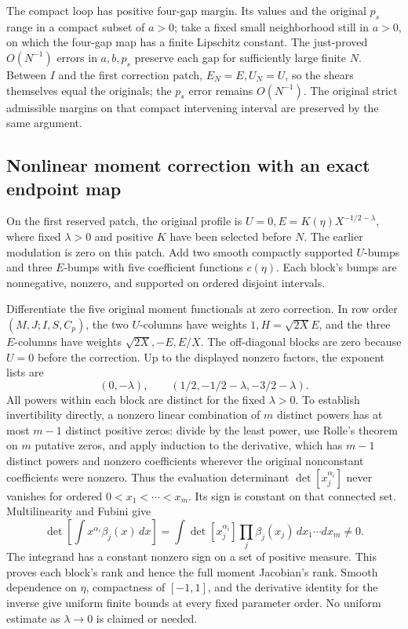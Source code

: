 \documentclass[10pt,a4paper]{article}
\begin{document}
The compact loop has positive four-gap margin. Its values and the original \(p_s\) range in a compact subset of \(a>0\); take a fixed small neighborhood still in \(a>0\), on which the four-gap map has a finite Lipschitz constant. The just-proved \(O(N^{-1})\) errors in \(a,b,p_s\) preserve each gap for sufficiently large finite \(N\). Between \(I\) and the first correction patch, \(E_N=E,U_N=U\), so the shears themselves equal the originals; the \(p_s\) error remains \(O(N^{-1})\). The original strict admissible margins on that compact intervening interval are preserved by the same argument.

\subsection{Nonlinear moment correction with an exact endpoint map}\label{nonlinear-moment-correction-with-an-exact-endpoint-map}

On the first reserved patch, the original profile is \(U=0,E=K(\eta)X^{-1/2-\lambda}\), where fixed \(\lambda>0\) and positive \(K\) have been selected before \(N\). The earlier modulation is zero on this patch. Add two smooth compactly supported \(U\)-bumps and three \(E\)-bumps with five coefficient functions \(c(\eta)\). Each block's bumps are nonnegative, nonzero, and supported on ordered disjoint intervals.

Differentiate the five original moment functionals at zero correction. In row order \((M,J;I,S,C_p)\), the two \(U\)-columns have weights \(1,H=\sqrt{2X}E\), and the three \(E\)-columns have weights \(\sqrt{2X},-E,E/X\). The off-diagonal blocks are zero because \(U=0\) before the correction. Up to the displayed nonzero factors, the exponent lists are \[
(0,-\lambda),\qquad
(1/2,-1/2-\lambda,-3/2-\lambda).
\] All powers within each block are distinct for the fixed \(\lambda>0\). To establish invertibility directly, a nonzero linear combination of \(m\) distinct powers has at most \(m-1\) distinct positive zeros: divide by the least power, use Rolle's theorem on \(m\) putative zeros, and apply induction to the derivative, which has \(m-1\) distinct powers and nonzero coefficients wherever the original nonconstant coefficients were nonzero. Thus the evaluation determinant \(\det[x_j^{\alpha_i}]\) never vanishes for ordered \(0<x_1<\cdots<x_m\). Its sign is constant on that connected set. Multilinearity and Fubini give \[
\det\left[\int x^{\alpha_i}\beta_j(x)\,dx\right]
=\int\det[x_j^{\alpha_i}]\prod_j\beta_j(x_j)\,dx_1\cdots dx_m\ne0.
\] The integrand has a constant nonzero sign on a set of positive measure. This proves each block's rank and hence the full moment Jacobian's rank. Smooth dependence on \(\eta\), compactness of \([-1,1]\), and the derivative identity for the inverse give uniform finite bounds at every fixed parameter order. No uniform estimate as \(\lambda\to0\) is claimed or needed.
\end{document}
